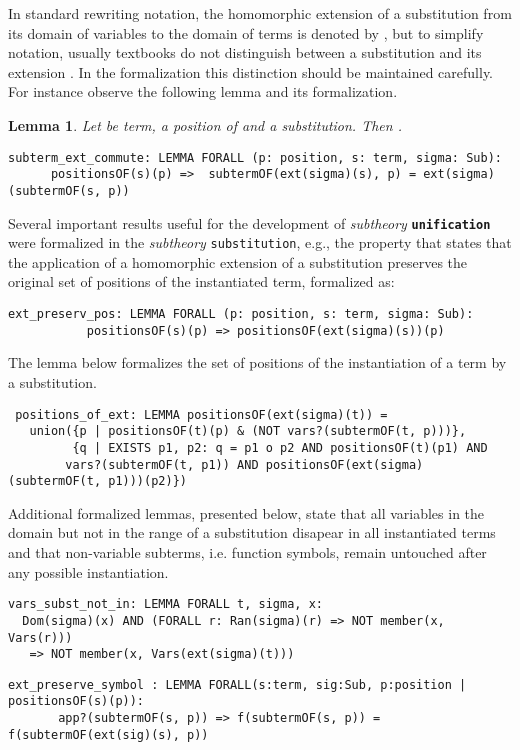 \documentclass[submission,copyright,creativecommons]{eptcs}
\newtheorem{lemma}[theorem]{Lemma}
\begin{document}
In standard rewriting notation, the homomorphic extension of a
substitution  from its domain of variables to the domain of
terms is denoted by , but to simplify notation, usually
textbooks do not distinguish between a substitution  and its
extension .  In the formalization this distinction
should be maintained carefully.  For instance observe the following
lemma and its formalization.
 
\begin{lemma}
  Let  be term,  a position of  and  a
  substitution. Then .
\end{lemma}

{\small
\begin{verbatim}
subterm_ext_commute: LEMMA FORALL (p: position, s: term, sigma: Sub):
      positionsOF(s)(p) =>  subtermOF(ext(sigma)(s), p) = ext(sigma)(subtermOF(s, p))
\end{verbatim}
}

Several important results useful for the development of
\emph{subtheory} {\tt \bf unification} were formalized in the
\emph{subtheory} {\tt substitution}, e.g., the property that states
that the application of a homomorphic extension of a substitution
preserves the original set of positions of the instantiated term,
formalized as:

{\small
\begin{verbatim}
ext_preserv_pos: LEMMA FORALL (p: position, s: term, sigma: Sub):
           positionsOF(s)(p) => positionsOF(ext(sigma)(s))(p)
\end{verbatim}
}

The lemma below formalizes the set of positions of the instantiation
of a term by a substitution.

{\small
\begin{verbatim}
 positions_of_ext: LEMMA positionsOF(ext(sigma)(t)) = 
   union({p | positionsOF(t)(p) & (NOT vars?(subtermOF(t, p)))}, 
         {q | EXISTS p1, p2: q = p1 o p2 AND positionsOF(t)(p1) AND 
        vars?(subtermOF(t, p1)) AND positionsOF(ext(sigma)(subtermOF(t, p1)))(p2)})
\end{verbatim}}

  Additional formalized lemmas, presented below, state that all
  variables in the domain but not in the range of a substitution
   disapear in all  instantiated terms and that
  non-variable subterms, i.e. function symbols, remain untouched after
  any possible instantiation.

  {\small
\begin{verbatim}
vars_subst_not_in: LEMMA FORALL t, sigma, x: 
  Dom(sigma)(x) AND (FORALL r: Ran(sigma)(r) => NOT member(x, Vars(r)))
   => NOT member(x, Vars(ext(sigma)(t)))
\end{verbatim}
  } {\small
\begin{verbatim}
ext_preserve_symbol : LEMMA FORALL(s:term, sig:Sub, p:position | positionsOF(s)(p)):
       app?(subtermOF(s, p)) => f(subtermOF(s, p)) = f(subtermOF(ext(sig)(s), p)) 
\end{verbatim}
  }
  
\end{document}
